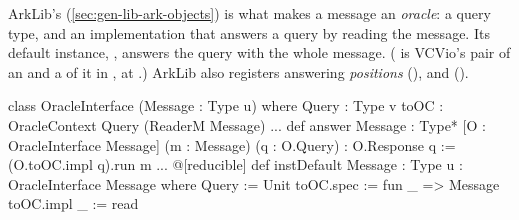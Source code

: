 ArkLib's  (\cref{sec:gen-lib-ark-objects}) is what makes a message an
\emph{oracle}: a query type, and an implementation that answers a query by reading the message.
Its default instance, , answers the query \lean{()} with the whole message.
( is VCVio's pair of an  and a  of it
in , \allowbreak{}\allowbreak{} at .) ArkLib also
registers  answering \emph{positions}
(), and \allowbreak{}
().

\begin{leancode}
class OracleInterface (Message : Type u) where
  Query : Type v
  toOC : OracleContext Query (ReaderM Message)
...
def answer {Message : Type*} [O : OracleInterface Message]
    (m : Message) (q : O.Query) : O.Response q :=
  (O.toOC.impl q).run m
...
@[reducible]
def instDefault {Message : Type u} : OracleInterface Message where
  Query := Unit
  toOC.spec := fun _ => Message
  toOC.impl _ := read
\end{leancode}


